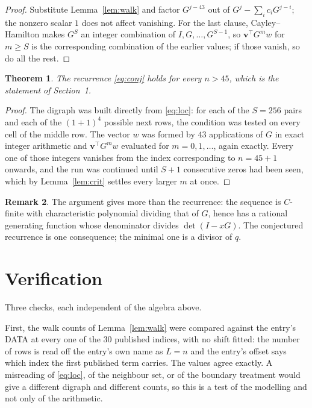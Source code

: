 \documentclass[11pt,a4paper]{article}
\theoremstyle{plain}
\newtheorem{theorem}{Theorem}
\theoremstyle{definition}
\newtheorem{remark}[theorem]{Remark}
\begin{document}
\begin{proof}
Substitute Lemma~\ref{lem:walk} and factor $G^{j-43}$ out of
$G^{j}-\sum_ic_iG^{j-i}$; the nonzero scalar $1$ does not affect
vanishing. For the last clause, Cayley--Hamilton makes $G^{S}$ an integer combination of
$I,G,\dots,G^{S-1}$, so $\mathbf{v}^{\!\top}G^{m}w$ for $m\ge S$ is the corresponding
combination of the earlier values; if those vanish, so do all the rest.
\end{proof}

\begin{theorem}
The recurrence \eqref{eq:conj} holds for every $n>45$, which is the statement of
Section~1.
\end{theorem}

\begin{proof}
The digraph was built directly from \eqref{eq:loc}: for each of the $S=256$ pairs and each
of the $(1+1)^{4}$ possible next rows, the condition was tested on every cell of
the middle row. The vector $w$ was formed by $43$ applications of $G$ in exact integer
arithmetic and $\mathbf{v}^{\!\top}G^{m}w$ evaluated for $m=0,1,\dots$, again exactly.
Every one of those integers vanishes from the index corresponding to $n=45+1$ onwards,
and the run was continued until $S+1$ consecutive zeros had been seen, which by
Lemma~\ref{lem:crit} settles every larger $m$ at once.
\end{proof}

\begin{remark}
The argument gives more than the recurrence: the sequence is $C$-finite with characteristic
polynomial dividing that of $G$, hence has a rational generating function whose denominator
divides $\det(I-xG)$. The conjectured recurrence is one consequence; the minimal one is a
divisor of $q$.
\end{remark}

\section{Verification}

Three checks, each independent of the algebra above.

First, the walk counts of Lemma~\ref{lem:walk} were compared against the entry's DATA at
every one of the $30$ published indices, with no shift fitted: the number of rows is
read off the entry's own name as $L=n$ and the entry's offset says which index the first
published term carries. The values agree exactly. A misreading of \eqref{eq:loc}, of the
neighbour set, or of the boundary treatment would give a different digraph and different
counts, so this is a test of the modelling and not only of the arithmetic.
\end{document}
